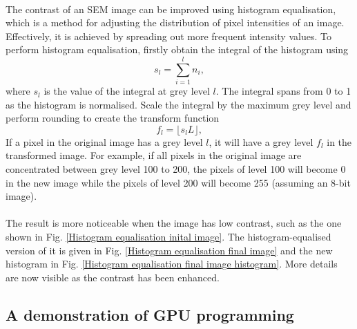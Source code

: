 \documentclass[12pt, twocolumn]{report}
\begin{document}
\paragraph{}
The contrast of an SEM image can be improved using histogram equalisation, which is a method for adjusting the distribution of pixel intensities of an image. Effectively, it is achieved by spreading out more frequent intensity values. To perform histogram equalisation, firstly obtain the integral of the histogram using
\[s_l = \sum_{i=1}^{l} n_i,\]
where $s_l$ is the value of the integral at grey level $l$. The integral spans from 0 to 1 as the histogram is normalised. Scale the integral by the maximum grey level and perform rounding to create the transform function
\begin{equation}
    f_l = \lfloor s_lL \rfloor,
    \label{Histogram equalisation transform function}
\end{equation}
If a pixel in the original image has a grey level $l$, it will have a grey level $f_l$ in the transformed image. For example, if all pixels in the original image are concentrated between grey level 100 to 200, the pixels of level 100 will become 0 in the new image while the pixels of level 200 will become 255 (assuming an 8-bit image).

\paragraph{}
The result is more noticeable when the image has low contrast, such as the one shown in Fig. \ref{Histogram equalisation inital image}. The histogram-equalised version of it is given in Fig. \ref{Histogram equalisation final image} and the new histogram in Fig. \ref{Histogram equalisation final image histogram}. More details are now visible as the contrast has been enhanced.

\subsection{A demonstration of GPU programming}
\end{document}
